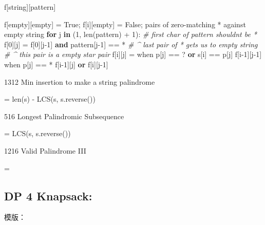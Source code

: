 \documentclass[
]{article}
\newenvironment{Shaded}{}{}
\newcommand{\BuiltInTok}[1]{#1}
\newcommand{\CommentTok}[1]{\textcolor[rgb]{0.38,0.63,0.69}{\textit{#1}}}
\newcommand{\ControlFlowTok}[1]{\textcolor[rgb]{0.00,0.44,0.13}{\textbf{#1}}}
\newcommand{\DecValTok}[1]{\textcolor[rgb]{0.25,0.63,0.44}{#1}}
\newcommand{\KeywordTok}[1]{\textcolor[rgb]{0.00,0.44,0.13}{\textbf{#1}}}
\newcommand{\NormalTok}[1]{#1}
\newcommand{\OperatorTok}[1]{\textcolor[rgb]{0.40,0.40,0.40}{#1}}
\newcommand{\StringTok}[1]{\textcolor[rgb]{0.25,0.44,0.63}{#1}}
\newcommand{\VariableTok}[1]{\textcolor[rgb]{0.10,0.09,0.49}{#1}}
\begin{document}
\begin{Shaded}
\begin{Highlighting}[]
\NormalTok{f[string][pattern]}

\NormalTok{f[empty][empty] }\OperatorTok{=} \VariableTok{True}\OperatorTok{;}\NormalTok{ f[i][empty] }\OperatorTok{=} \VariableTok{False}\OperatorTok{;}\NormalTok{ pairs of zero}\OperatorTok{{-}}\NormalTok{matching }\OperatorTok{*}\NormalTok{ against empty string}
\ControlFlowTok{for}\NormalTok{ j }\KeywordTok{in}\NormalTok{ (}\DecValTok{1}\NormalTok{, }\BuiltInTok{len}\NormalTok{(pattern) }\OperatorTok{+} \DecValTok{1}\NormalTok{):  }\CommentTok{\# first char of pattern shouldn\textquotesingle{}t be *}
\NormalTok{  f[}\DecValTok{0}\NormalTok{][j] }\OperatorTok{=}\NormalTok{ f[}\DecValTok{0}\NormalTok{][j}\OperatorTok{{-}}\DecValTok{1}\NormalTok{] }\KeywordTok{and}\NormalTok{ pattern[j}\OperatorTok{{-}}\DecValTok{1}\NormalTok{] }\OperatorTok{==} \StringTok{\textquotesingle{}*\textquotesingle{}}
  \CommentTok{\# 				\^{} last pair of * gets us to empty string}
  \CommentTok{\#												\^{} this pair is a empty star pair}
\NormalTok{f[i][j] }\OperatorTok{=}
\NormalTok{					when p[j] }\OperatorTok{==} \StringTok{\textquotesingle{}?\textquotesingle{}} \KeywordTok{or}\NormalTok{ s[i] }\OperatorTok{==}\NormalTok{ p[j]			f[i}\OperatorTok{{-}}\DecValTok{1}\NormalTok{][j}\OperatorTok{{-}}\DecValTok{1}\NormalTok{] }
\NormalTok{  				when p[j] }\OperatorTok{==} \StringTok{\textquotesingle{}*\textquotesingle{}}\NormalTok{ 											f[i}\OperatorTok{{-}}\DecValTok{1}\NormalTok{][j] }\KeywordTok{or}\NormalTok{ f[i][j}\OperatorTok{{-}}\DecValTok{1}\NormalTok{]}

\end{Highlighting}
\end{Shaded}

1312 Min insertion to make a string palindrome

= len(s) - LCS(s, s.reverse())

516 Longest Palindromic Subsequence

= LCS(s, s.reverse())

1216 Valid Palindrome III

=

\hypertarget{dp-4-knapsack}{%
\subsection{\texorpdfstring{DP 4 Knapsack:
}{DP 4 Knapsack: }}\label{dp-4-knapsack}}

模版：
\end{document}
